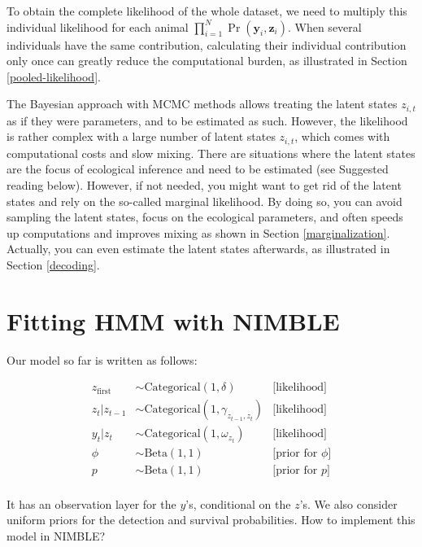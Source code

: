 \documentclass[
  12pt,
]{krantz}
\begin{document}
To obtain the complete likelihood of the whole dataset, we need to multiply this individual likelihood for each animal \(\displaystyle{\prod_{i=1}^N{\Pr(\mathbf{y}_i,\mathbf{z}_i)}}\). When several individuals have the same contribution, calculating their individual contribution only once can greatly reduce the computational burden, as illustrated in Section \ref{pooled-likelihood}.

The Bayesian approach with MCMC methods allows treating the latent states \(z_{i,t}\) as if they were parameters, and to be estimated as such. However, the likelihood is rather complex with a large number of latent states \(z_{i,t}\), which comes with computational costs and slow mixing. There are situations where the latent states are the focus of ecological inference and need to be estimated (see Suggested reading below). However, if not needed, you might want to get rid of the latent states and rely on the so-called marginal likelihood. By doing so, you can avoid sampling the latent states, focus on the ecological parameters, and often speeds up computations and improves mixing as shown in Section \ref{marginalization}. Actually, you can even estimate the latent states afterwards, as illustrated in Section \ref{decoding}.

\hypertarget{fitting-hmm-with-nimble}{%
\section{Fitting HMM with NIMBLE}\label{fitting-hmm-with-nimble}}

Our model so far is written as follows:

\begin{align*}
   z_{\text{first}} &\sim \text{Categorical}(1, \delta) &\text{[likelihood]}\\
   z_t | z_{t-1} &\sim \text{Categorical}(1, \gamma_{z_{t-1},z_{t}}) &\text{[likelihood]}\\
   y_t | z_{t} &\sim \text{Categorical}(1, \omega_{z_{t}}) &\text{[likelihood]}\\
  \phi &\sim \text{Beta}(1, 1) &\text{[prior for }\phi \text{]} \\
  p &\sim \text{Beta}(1, 1) &\text{[prior for }p \text{]} \\
\end{align*}

It has an observation layer for the \(y\)'s, conditional on the \(z\)'s. We also consider uniform priors for the detection and survival probabilities. How to implement this model in NIMBLE?
\end{document}
